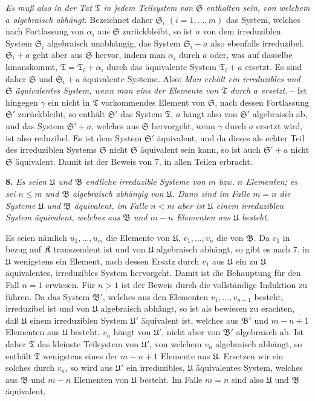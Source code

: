 \emph{Es muß also in der Tat $\mathfrak T$ in jedem Teilsystem von $\mathfrak S$ enthalten sein, von welchem $a$ algebraisch abhängt.} Bezeichnet daher $\mathfrak S_i$ $(i=1,\ldots,m)$ das System, welches nach Fortlassung von $\alpha_i$ aus $\mathfrak S$ zurückbleibt, so ist $a$ von dem irreduziblen System $\mathfrak S_i$ algebraisch unabhängig, das System $\mathfrak S_i+a$ also ebenfalls irreduzibel. $\mathfrak S_i+a$ geht aber aus $\mathfrak S$ hervor, indem man $\alpha_i$ durch $a$ oder, was auf dasselbe hinauskommt, $\mathfrak T=\mathfrak T_i+\alpha_i$ durch das äquivalente System $\mathfrak T_i+a$ ersetzt. Es sind daher $\mathfrak S$ und $\mathfrak S_i+a$ äquivalente Systeme. Also: \emph{Man erhält ein irreduzibles und $\mathfrak S$ äquivalentes System, wenn man eins der Elemente von $\mathfrak T$ durch $a$ ersetzt.} -- Ist hingegen $\gamma$ ein nicht in $\mathfrak T$ vorkommendes Element von $\mathfrak S$, nach dessen Fortlassung $\mathfrak S'$ zurückbleibt, so enthält $\mathfrak S'$ das System $\mathfrak T$, $a$ hängt also von $\mathfrak S'$ algebraisch ab, und das System $\mathfrak S'+a$, welches aus $\mathfrak S$ hervorgeht, wenn $\gamma$ durch $a$ ersetzt wird, ist also reduzibel. Es ist dem System $\mathfrak S'$ äquivalent, und da dieses als echter Teil des irreduziblen Systems $\mathfrak S$ nicht $\mathfrak S$ äquivalent sein kann, so ist auch $\mathfrak S'+a$ nicht $\mathfrak S$ äquivalent. Damit ist der Beweis von 7. in allen Teilen erbracht.

\textbf{8.} \emph{Es seien $\mathfrak U$ und $\mathfrak B$ endliche irreduzible Systeme von $m$ bzw. $n$ Elementen; es sei $n\leq m$ und $\mathfrak B$ algebraisch abhängig von $\mathfrak U$. Dann sind im Falle $m=n$ die Systeme $\mathfrak U$ und $\mathfrak B$ äquivalent, im Falle $n<m$ aber ist $\mathfrak U$ einem irreduziblen System äquivalent, welches aus $\mathfrak B$ und $m-n$ Elementen aus $\mathfrak U$ besteht.}

Es seien nämlich $u_1,\ldots,u_m$ die Elemente von $\mathfrak U$, $v_1,\ldots,v_n$ die von $\mathfrak B$. Da $v_1$ in bezug auf $\mathfrak K$ transzendent ist und von $\mathfrak U$ algebraisch abhängt, so gibt es nach 7. in $\mathfrak U$ wenigstens ein Element, nach dessen Ersatz durch $v_1$ aus $\mathfrak U$ ein zu $\mathfrak U$ äquivalentes, irreduzibles System hervorgeht. Damit ist die Behauptung für den Fall $n=1$ erwiesen. Für $n>1$ ist der Beweis durch die vollständige Induktion zu führen. Da das System $\mathfrak B'$, welches aus den Elementen $v_1,\ldots,v_{n-1}$ besteht, irreduzibel ist und von $\mathfrak U$ algebraisch abhängt, so ist als bewiesen zu erachten, daß $\mathfrak U$ einem irreduziblen System $\mathfrak U'$ äquivalent ist, welches aus $\mathfrak B'$ und $m-n+1$ Elementen aus $\mathfrak U$ besteht. $v_n$ hängt von $\mathfrak U'$, nicht aber von $\mathfrak B'$ algebraisch ab. Ist daher $\mathfrak T$ das kleinste Teilsystem von $\mathfrak U'$, von welchem $v_n$ algebraisch abhängt, so enthält $\mathfrak T$ wenigstens eines der $m-n+1$ Elemente aus $\mathfrak U$. Ersetzen wir ein solches durch $v_n$, so wird aus $\mathfrak U'$ ein irreduzibles, $\mathfrak U$ äquivalentes System, welches aus $\mathfrak B$ und $m-n$ Elementen von $\mathfrak U$ besteht. Im Falle $m=n$ sind also $\mathfrak U$ und $\mathfrak B$ äquivalent.

